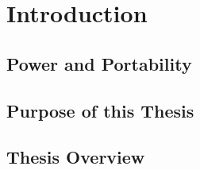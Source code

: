 \chapter{Introduction} %

\label{Chapter1} %

\section{Power and Portability}

\todosection


\section{Purpose of this Thesis}

\todosection


\section{Thesis Overview}

\todosection